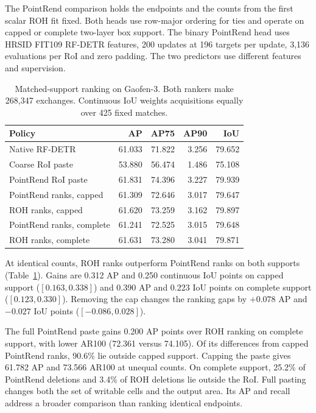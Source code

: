 \documentclass[journal]{IEEEtran}
\begin{document}
The PointRend comparison holds the endpoints and the counts from the first scalar ROH fit fixed. Both heads use row-major ordering for ties and operate on capped or complete two-layer box support. The binary PointRend head uses HRSID FIT109 RF-DETR features, 200 updates at 196 targets per update, 3,136 evaluations per RoI and zero padding. The two predictors use different features and supervision.

\begin{table}[t]
\centering
\caption{Matched-support ranking on Gaofen-3. Both rankers make 268,347 exchanges. Continuous IoU weights acquisitions equally over 425 fixed matches.}
\label{tab:rsdd-pointrend}
\setlength{\tabcolsep}{4pt}
\begin{tabular}{lrrrr}
\toprule
Policy & AP & AP75 & AP90 & IoU\\
\midrule
Native RF-DETR & 61.033 & 71.822 & 3.256 & 79.652\\
Coarse RoI paste & 53.880 & 56.474 & 1.486 & 75.108\\
PointRend RoI paste & 61.831 & 74.396 & 3.227 & 79.939\\
\midrule
PointRend ranks, capped & 61.309 & 72.646 & 3.017 & 79.647\\
ROH ranks, capped & 61.620 & 73.259 & 3.162 & 79.897\\
PointRend ranks, complete & 61.241 & 72.525 & 3.015 & 79.648\\
ROH ranks, complete & 61.631 & 73.280 & 3.041 & 79.871\\
\bottomrule
\end{tabular}
\end{table}

At identical counts, ROH ranks outperform PointRend ranks on both supports (Table~\ref{tab:rsdd-pointrend}). Gains are 0.312 AP and 0.250 continuous IoU points on capped support (\([0.163,0.338]\)) and 0.390 AP and 0.223 IoU points on complete support (\([0.123,0.330]\)). Removing the cap changes the ranking gaps by \(+0.078\) AP and \(-0.027\) IoU points (\([-0.086,0.028]\)).

The full PointRend paste gains 0.200 AP points over ROH ranking on complete support, with lower AR100 (72.361 versus 74.105). Of its differences from capped PointRend ranks, 90.6\% lie outside capped support. Capping the paste gives 61.782 AP and 73.566 AR100 at unequal counts. On complete support, 25.2\% of PointRend deletions and 3.4\% of ROH deletions lie outside the RoI. Full pasting changes both the set of writable cells and the output area. Its AP and recall address a broader comparison than ranking identical endpoints.
\end{document}

